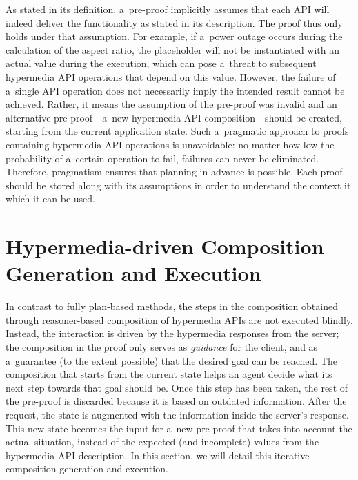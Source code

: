 As stated in its definition,
a~pre-proof implicitly assumes that each API will indeed deliver the functionality
as stated in its \restdesc description.
The proof thus only holds under that assumption.
For example, if a~power outage occurs during the calculation of the aspect ratio,
the placeholder will not be instantiated with an actual value during the execution,
which can pose a~threat to subsequent hypermedia API operations that depend on this value.
However, the failure of a~single API operation
does not necessarily imply the intended result cannot be achieved.
Rather, it means the assumption of the pre-proof was invalid
and an alternative pre-proof---a~new hypermedia API composition---should be created,
starting from the current application state.
Such a~pragmatic approach to proofs containing hypermedia API operations is unavoidable:
no matter how low the probability of a~certain operation to fail,
failures can never be eliminated.
Therefore, pragmatism ensures that planning in advance is possible.
Each proof should be stored along with its assumptions
in order to understand the context it which it can be used.

\section{Hypermedia-driven Composition Generation and Execution}
\label{sec:Composition}
In contrast to fully plan-based methods,
the steps in the composition obtained through reasoner-based composition of hypermedia APIs
are not executed blindly.
Instead, the interaction is driven by the hypermedia responses from the server;
the composition in the proof only serves as \emph{guidance} for the client,
and as a~guarantee (to the extent possible) that the desired goal can be reached.
The composition that starts from the current state
helps an agent decide what its next step towards that goal should be.
Once this step has been taken, the rest of the pre-proof is discarded
because it is based on outdated information.
After the request,
the state is augmented with the information inside the server's response.
This new state becomes the input for a~new pre-proof
that takes into account the actual situation,
instead of the expected (and incomplete) values from the hypermedia API description.
In this section, we will detail this iterative composition generation
and execution.


